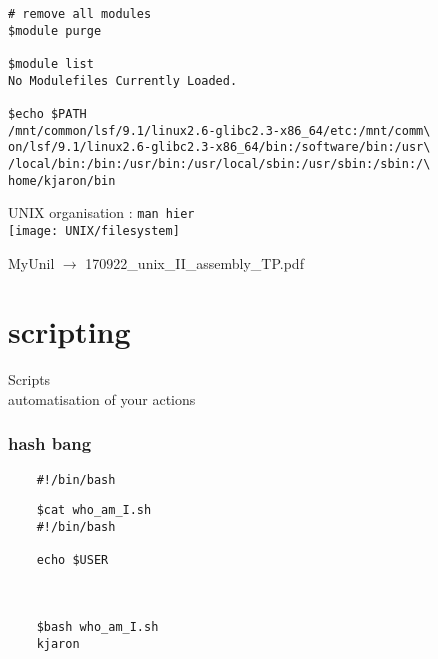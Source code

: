 \documentclass[xcolor=dvipsnames]{beamer}
\begin{document}
\begin{frame}[fragile]
\footnotesize
\begin{verbatim}
# remove all modules
$module purge

$module list
No Modulefiles Currently Loaded.

$echo $PATH
/mnt/common/lsf/9.1/linux2.6-glibc2.3-x86_64/etc:/mnt/comm\
on/lsf/9.1/linux2.6-glibc2.3-x86_64/bin:/software/bin:/usr\
/local/bin:/bin:/usr/bin:/usr/local/sbin:/usr/sbin:/sbin:/\
home/kjaron/bin
\end{verbatim}
\end{frame}

\begin{frame}[fragile]
	\begin{center}
		\huge
		UNIX organisation : \verb!man hier! \\
		\vspace{1cm}
		\texttt{[image: UNIX/filesystem]}
	\end{center}
\end{frame}

\begin{frame}
	\begin{center}
		\Large
		MyUnil $\rightarrow$ 170922\_unix\_II\_assembly\_TP.pdf
	\end{center}
\end{frame}

\section{scripting}

\begin{frame}[fragile]
	\begin{center}
		\Huge
		Scripts \\
		\Large
		automatisation of your actions
	\end{center}
\end{frame}

\begin{frame}[fragile]
\frametitle{hash bang}
\LARGE
\begin{verbatim}
	#!/bin/bash
\end{verbatim}
\end{frame}

\begin{frame}[fragile]
\LARGE
\begin{verbatim}
	$cat who_am_I.sh
	#!/bin/bash

	echo $USER



	$bash who_am_I.sh
	kjaron
\end{verbatim}
\end{frame}
\end{document}
